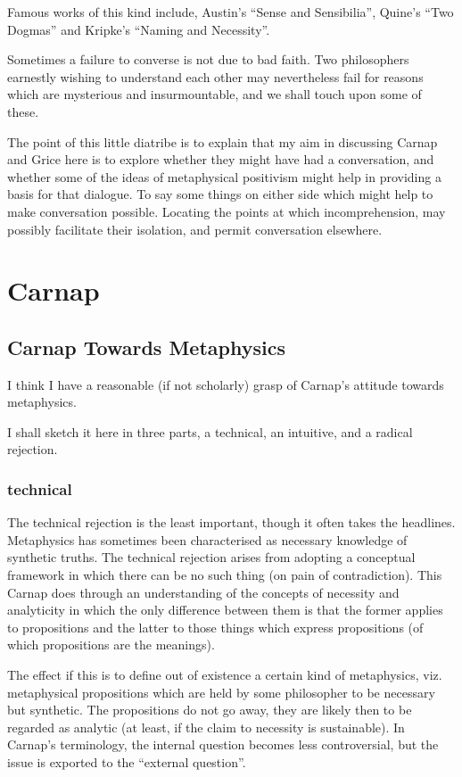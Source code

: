 \documentclass[10pt,titlepage]{book}
\begin{document}
Famous works of this kind include, Austin's ``Sense and Sensibilia'', Quine's ``Two Dogmas'' and Kripke's ``Naming and Necessity''.

Sometimes a failure to converse is not due to bad faith.
Two philosophers earnestly wishing to understand each other may nevertheless fail for reasons which are mysterious and insurmountable, and we shall touch upon some of these.

The point of this little diatribe is to explain that my aim in discussing Carnap and Grice here is to explore whether they might have had a conversation, and whether some of the ideas of metaphysical positivism might help in providing a basis for that dialogue.
To say some things on either side which might help to make conversation possible.
Locating the points at which incomprehension, may possibly facilitate their isolation, and permit conversation elsewhere.

\chapter{Carnap}

\section{Carnap Towards Metaphysics}

I think I have a reasonable (if not scholarly) grasp of Carnap's attitude towards metaphysics.

I shall sketch it here in three parts, a technical, an intuitive, and a radical rejection.

\subsection{technical}
The technical rejection is the least important, though it often takes the headlines.
Metaphysics has sometimes been characterised as necessary knowledge of synthetic truths.
The technical rejection arises from adopting a conceptual framework in which there can be no such thing (on pain of contradiction).
This Carnap does through an understanding of the concepts of necessity and analyticity in which the only difference between them is that the former applies to propositions and the latter to those things which express propositions (of which propositions are the meanings).

The effect if this is to define out of existence a certain kind of metaphysics, viz. metaphysical propositions which are held by some philosopher to be necessary but synthetic.
The propositions do not go away, they are likely then to be regarded as analytic (at least, if the claim to necessity is sustainable).
In Carnap's terminology, the internal question becomes less controversial, but the issue is exported to the ``external question''.
\end{document}
